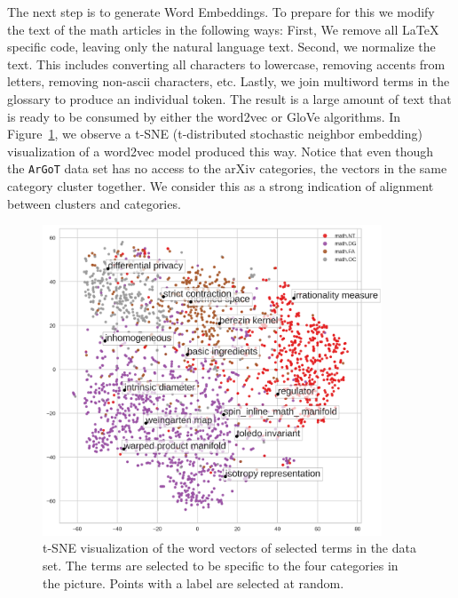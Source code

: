 \documentclass[submission,copyright,creativecommons]{eptcs}
\newcommand{\argot}{\texttt{ArGoT}\xspace}
\begin{document}
The next step is to generate Word Embeddings. To prepare for this we modify the text of the math articles in the following ways: First, We remove all \LaTeX{} specific code, leaving only the natural language text. Second, we normalize the text. This includes converting all characters to lowercase, removing accents from letters, removing non-ascii characters, etc. Lastly, we join multiword terms in the glossary to produce an individual token. The result is a large amount of text that is ready to be consumed by either the word2vec or GloVe algorithms. 
In Figure~\ref{scatter}, we observe a t-SNE (t-distributed stochastic
neighbor embedding) visualization of a word2vec 
model produced this way. Notice that even though the \argot data set has no access to the arXiv categories, the vectors in the same category cluster together.
We consider this as a strong indication of alignment between clusters and categories.

\begin{figure}
    \centering
    \includegraphics[width=0.9\textwidth]{scatter_plot/scatter_option5.png}
    \caption{\label{scatter} t-SNE visualization of the word vectors
        of selected terms in the data set. The terms are selected to be specific to 
        the four categories in the picture.  Points with a label are selected
    at random.}
\end{figure}
  
\end{document}
